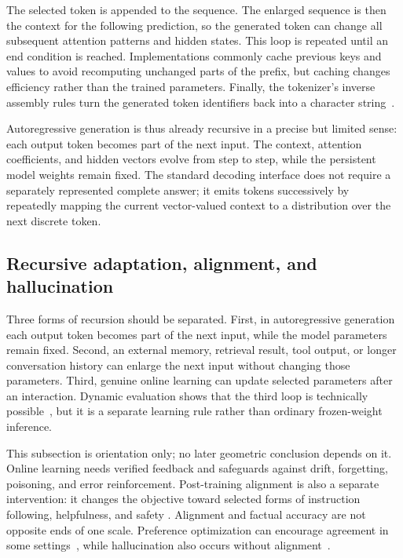 \documentclass[
  aps,
  reprint,
  superscriptaddress,
  floatfix,
  nofootinbib,
  longbibliography
]{revtex4-2}
\begin{document}
The selected token is appended to the sequence.  The enlarged sequence is
then the context for the following prediction, so the generated token can
change all subsequent attention patterns and hidden states.  This loop is
repeated until an end condition is reached.  Implementations commonly cache
previous keys and values to avoid recomputing unchanged parts of the prefix,
but caching changes efficiency rather than the trained parameters.  Finally,
the tokenizer's inverse assembly rules turn the generated token identifiers
back into a character string~\cite{Brown2020May}.

Autoregressive generation is thus already recursive in a precise but limited
sense: each output token becomes part of the next input.  The context,
attention coefficients, and hidden vectors evolve from step to step, while
the persistent model weights remain fixed.  The standard decoding interface
does not require a separately represented complete answer; it emits tokens
successively by repeatedly mapping the current vector-valued context to a
distribution over the next discrete token.

\subsection{Recursive adaptation, alignment, and hallucination}
\label{sec:prose-online}

Three forms of recursion should be separated.  First, in autoregressive
generation each output token becomes part of the next input, while the model
parameters remain fixed.  Second, an external memory, retrieval result, tool
output, or longer conversation history can enlarge the next input without
changing those parameters.  Third, genuine online learning can update selected
parameters after an interaction.  Dynamic evaluation shows that the third loop
is technically possible~\cite{rannentriki2024dynamic}, but it is a separate
learning rule rather than ordinary frozen-weight inference.

This subsection is orientation only; no later geometric conclusion depends on
it.  Online learning needs verified feedback and safeguards against drift,
forgetting, poisoning, and error reinforcement.  Post-training alignment is
also a separate intervention: it changes the objective toward selected forms
of instruction following, helpfulness, and safety
\cite{ouyang2022instructgpt}.  Alignment and factual accuracy are not opposite
ends of one scale.  Preference optimization can encourage agreement in some
settings~\cite{sharma2023sycophancy}, while hallucination also occurs without
alignment~\cite{Kalai2025Why}.
\end{document}
